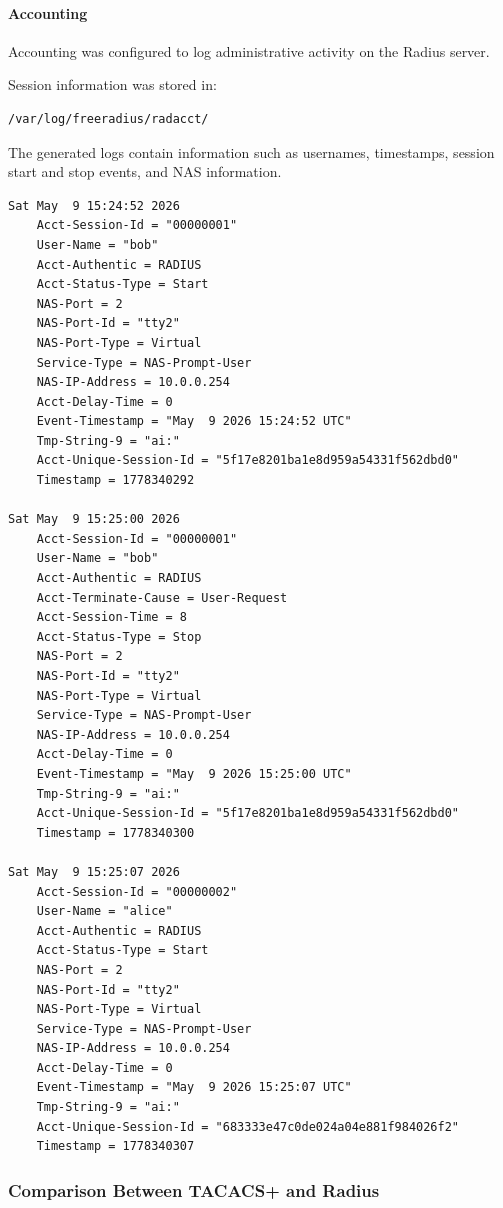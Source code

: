 \documentclass[12pt]{article}
\begin{document}
\paragraph{Accounting}

Accounting was configured to log administrative activity on the Radius server.

Session information was stored in:

\begin{verbatim}
/var/log/freeradius/radacct/
\end{verbatim}

The generated logs contain information such as usernames, timestamps, session start and stop events, and NAS information.

\begin{verbatim}
Sat May  9 15:24:52 2026
    Acct-Session-Id = "00000001"
    User-Name = "bob"
    Acct-Authentic = RADIUS
    Acct-Status-Type = Start
    NAS-Port = 2
    NAS-Port-Id = "tty2"
    NAS-Port-Type = Virtual
    Service-Type = NAS-Prompt-User
    NAS-IP-Address = 10.0.0.254
    Acct-Delay-Time = 0
    Event-Timestamp = "May  9 2026 15:24:52 UTC"
    Tmp-String-9 = "ai:"
    Acct-Unique-Session-Id = "5f17e8201ba1e8d959a54331f562dbd0"
    Timestamp = 1778340292

Sat May  9 15:25:00 2026
    Acct-Session-Id = "00000001"
    User-Name = "bob"
    Acct-Authentic = RADIUS
    Acct-Terminate-Cause = User-Request
    Acct-Session-Time = 8
    Acct-Status-Type = Stop
    NAS-Port = 2
    NAS-Port-Id = "tty2"
    NAS-Port-Type = Virtual
    Service-Type = NAS-Prompt-User
    NAS-IP-Address = 10.0.0.254
    Acct-Delay-Time = 0
    Event-Timestamp = "May  9 2026 15:25:00 UTC"
    Tmp-String-9 = "ai:"
    Acct-Unique-Session-Id = "5f17e8201ba1e8d959a54331f562dbd0"
    Timestamp = 1778340300

Sat May  9 15:25:07 2026
    Acct-Session-Id = "00000002"
    User-Name = "alice"
    Acct-Authentic = RADIUS
    Acct-Status-Type = Start
    NAS-Port = 2
    NAS-Port-Id = "tty2"
    NAS-Port-Type = Virtual
    Service-Type = NAS-Prompt-User
    NAS-IP-Address = 10.0.0.254
    Acct-Delay-Time = 0
    Event-Timestamp = "May  9 2026 15:25:07 UTC"
    Tmp-String-9 = "ai:"
    Acct-Unique-Session-Id = "683333e47c0de024a04e881f984026f2"
    Timestamp = 1778340307
\end{verbatim}

\subsubsection{Comparison Between TACACS+ and Radius}
\end{document}
